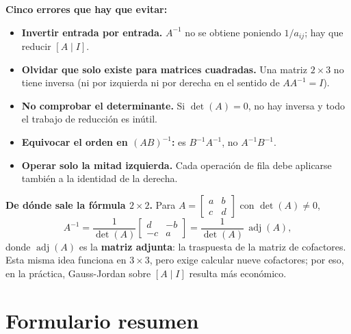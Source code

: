 \documentclass[12pt, letterpaper]{article}
\newcommand{\mwmat}[1]{\ensuremath{\begin{bmatrix}#1\end{bmatrix}}}
\begin{document}
\begin{cuadroadvertencia}
  \small
  \textbf{Cinco errores que hay que evitar:}
  \begin{itemize}[leftmargin=1.2em, nosep]
    \item \textbf{Invertir entrada por entrada.} $A^{-1}$ no se obtiene
          poniendo $1/a_{ij}$; hay que reducir $[A\mid I]$.
    \item \textbf{Olvidar que solo existe para matrices cuadradas.} Una
          matriz $2\times3$ no tiene inversa (ni por izquierda ni por
          derecha en el sentido de $AA^{-1}=I$).
    \item \textbf{No comprobar el determinante.} Si $\det(A)=0$, no hay
          inversa y todo el trabajo de reducción es inútil.
    \item \textbf{Equivocar el orden en $(AB)^{-1}$:} es $B^{-1}A^{-1}$, no
          $A^{-1}B^{-1}$.
    \item \textbf{Operar solo la mitad izquierda.} Cada operación de fila
          debe aplicarse también a la identidad de la derecha.
  \end{itemize}
\end{cuadroadvertencia}

\begin{cuadroextra}
  \small
  \textbf{De dónde sale la fórmula $2\times2$.} Para
  $A=\mwmat{a&b\\c&d}$ con $\det(A)\neq0$,
  \[
    A^{-1}=\frac{1}{\det(A)}\mwmat{d&-b\\-c&a}
    =\frac{1}{\det(A)}\,\operatorname{adj}(A),
  \]
  donde $\operatorname{adj}(A)$ es la \textbf{matriz adjunta}: la traspuesta
  de la matriz de cofactores. Esta misma idea funciona en $3\times3$, pero
  exige calcular nueve cofactores; por eso, en la práctica, Gauss-Jordan
  sobre $[A\mid I]$ resulta más económico.
\end{cuadroextra}

\section{Formulario resumen}
\end{document}
